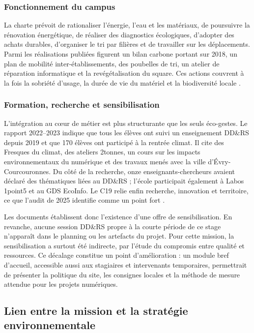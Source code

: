 \subsubsection{Fonctionnement du campus}

La charte prévoit de rationaliser l'énergie, l'eau et les matériaux, de
poursuivre la rénovation énergétique, de réaliser des diagnostics écologiques,
d'adopter des achats durables, d'organiser le tri par filières et de travailler
sur les déplacements. Parmi les réalisations publiées figurent un bilan carbone
portant sur 2018, un plan de mobilité inter-établissements, des poubelles de tri,
un atelier de réparation informatique et la revégétalisation du square. Ces
actions couvrent à la fois la sobriété d'usage, la durée de vie du matériel et
la biodiversité locale \cite{ensiieDDRS2026,ensiieRapportDDRS2023}.

\subsubsection{Formation, recherche et sensibilisation}

L'intégration au cœur de métier est plus structurante que les seuls éco-gestes.
Le rapport 2022--2023 indique que tous les élèves ont suivi un enseignement
DD\&RS depuis 2019 et que 170 élèves ont participé à la rentrée climat. Il cite
des Fresques du climat, des ateliers 2tonnes, un cours sur les impacts
environnementaux du numérique et des travaux menés avec la ville
d'Évry-Courcouronnes. Du côté de la recherche, onze enseignants-chercheurs
avaient déclaré des thématiques liées au DD\&RS ; l'école participait également
à Labos 1point5 et au GDS EcoInfo. Le C19 relie enfin recherche, innovation et
territoire, ce que l'audit de 2025 identifie comme un point fort
\cite{ensiieRapportDDRS2023,ensiieLabelDDRS2025}.

Les documents établissent donc l'existence d'une offre de sensibilisation. En
revanche, aucune session DD\&RS propre à la courte période de ce stage
n'apparaît dans le planning ou les artefacts du projet. Pour cette mission, la
sensibilisation a surtout été indirecte, par l'étude du compromis entre qualité
et ressources. Ce décalage constitue un point d'amélioration : un module bref
d'accueil, accessible aussi aux stagiaires et intervenants temporaires,
permettrait de présenter la politique du site, les consignes locales et la
méthode de mesure attendue pour les projets numériques.

\subsection{Lien entre la mission et la stratégie environnementale}
\label{ssec:ddrs_lien_mission}

